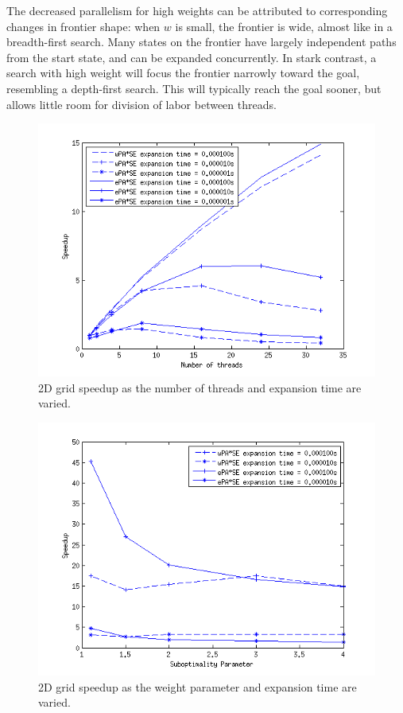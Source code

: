 \documentclass[letterpaper]{article}
\begin{document}
The decreased parallelism for high weights can be attributed to corresponding changes in frontier shape: when $w$ is small, the frontier is wide, almost like in a breadth-first search. Many states on the frontier have largely independent paths from the start state, and can be expanded concurrently. In stark contrast, a search with high weight will focus the frontier narrowly toward the goal, resembling a depth-first search. This will typically reach the goal sooner, but allows little room for division of labor between threads.

\begin{figure}
\centering\includegraphics[scale=0.55]{time_sweep_para.png}
\caption{2D grid speedup as the number of threads and expansion time are varied.}
\label{fig:time}
\end{figure}

\begin{figure}
\centering\includegraphics[scale=0.55]{eps_sweep_para.png}
\caption{2D grid speedup as the weight parameter and expansion time are varied.}
\label{fig:eps}
\end{figure}
\end{document}
